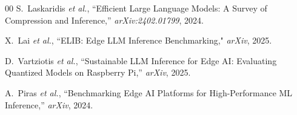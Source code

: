 \documentclass[onecolumn,10pt]{IEEEtran}
\begin{document}
\begin{thebibliography}{00}
S.~Laskaridis \textit{et al.}, ``Efficient Large Language Models: A
Survey of Compression and Inference,'' \textit{arXiv:2402.01799}, 2024.

X.~Lai \textit{et al.}, ``ELIB: Edge LLM Inference Benchmarking,"
\textit{arXiv}, 2025.

D.~Vartziotis \textit{et al.}, ``Sustainable LLM Inference for Edge
AI: Evaluating Quantized Models on Raspberry Pi,''
\textit{arXiv}, 2025.

A.~Piras \textit{et al.}, ``Benchmarking Edge AI Platforms for
High-Performance ML Inference,'' \textit{arXiv}, 2024.

\end{thebibliography}
\end{document}
